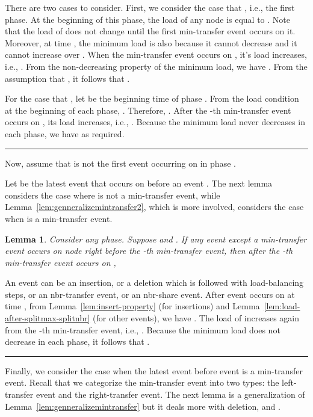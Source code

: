 \documentclass[a4paper]{article}
\newtheorem{lemma}{Lemma}
\newenvironment{proof}{{\bf Proof:}}{\hfill\rule{1.5mm}{3mm}\vspace{0.1in}}
\begin{document}
\begin{proof}
  There are two cases to consider.
  First, we consider the case that , i.e., the first phase.
  At the beginning of this phase, the load of any node is equal to . 
  Note that the load of  does not change until the first min-transfer event occurs on it.
  Moreover, at time , the minimum load is
  also  because it cannot decrease and it cannot increase over . 
  When the min-transfer event occurs on , it's load increases, i.e.,
  . From the
  non-decreasing property of the minimum load, we have 
  . From the assumption that , it follows that
  .
	  
  For the case that , let  be the beginning time of phase
  . From the load condition at the beginning of each phase,
   . Therefore, . 
   After the -th min-transfer event occurs on , its load increases,
  i.e., .  Because the minimum load never decreases in each phase,
  we have   as
  required.
\end{proof}

Now, assume that  is not the first event occurring on
 in phase .

Let  be the latest event that occurs on  before an event . The
next lemma considers the case where  is not a min-transfer event,
while Lemma~\ref{lem:genneralizemintransfer2}, which is more involved, considers the case when
 is a min-transfer event.

\begin{lemma}
  \label{lem:event-before-min-transfer}
  Consider any phase. Suppose  and . If any event  except a min-transfer event occurs on
  node  right before the -th min-transfer event, then after the
  -th min-transfer event occurs on , 
\end{lemma}

\begin{proof}
  An event  can be an insertion, or a deletion which is followed with
  load-balancing steps, or  an nbr-transfer event, or an nbr-share event.  
  After event  occurs on  at time ,
  from Lemma~\ref{lem:insert-property} (for insertions) and
  Lemma~\ref{lem:load-after-splitmax-splitnbr} (for other events), we have
  . The load of  increases again
  from  the -th min-transfer event, i.e.,
  . Because the minimum load does not
  decrease in each phase, it follows that .
\end{proof}

Finally, we consider the case when the latest event  before event
 is a min-transfer event.  Recall that we categorize the
min-transfer event into two types: the left-transfer event and the
right-transfer event.  The next lemma is a generalization of
Lemma~\ref{lem:genneralizemintransfer} but it deals more with
deletion, {\splitmax} and {\splitnbr}.
\end{document}
